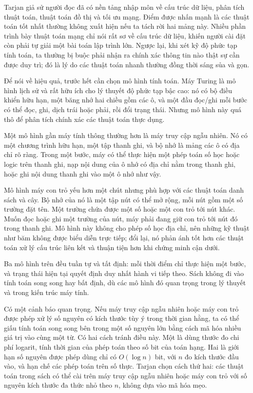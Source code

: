 \documentclass[11pt]{article}
\begin{document}
Tarjan giả sử người đọc đã có nền tảng nhập môn về cấu trúc dữ liệu, phân tích
thuật toán, thuật toán đồ thị và tối ưu mạng. Điểm được nhấn mạnh là các thuật
toán tốt nhất thường không xuất hiện nếu ta tách rời hai mảng này. Nhiều phần
trình bày thuật toán mạng chỉ nói rất sơ về cấu trúc dữ liệu, khiến người cài
đặt còn phải tự giải một bài toán lập trình lớn. Ngược lại, khi xét kỹ độ phức
tạp tính toán, ta thường bị buộc phải nhận ra chính xác thông tin nào thật sự
cần được duy trì; đó là lý do các thuật toán nhanh thường đồng thời sáng sủa
và gọn.

Để nói về hiệu quả, trước hết cần chọn mô hình tính toán. Máy Turing là mô
hình lịch sử và rất hữu ích cho lý thuyết độ phức tạp bậc cao: nó có bộ điều
khiển hữu hạn, một băng nhớ hai chiều gồm các ô, và một đầu đọc/ghi mỗi bước
có thể đọc, ghi, dịch trái hoặc phải, rồi đổi trạng thái. Nhưng mô hình này quá
thô để phân tích chính xác các thuật toán thực dụng.

Một mô hình gần máy tính thông thường hơn là máy truy cập ngẫu nhiên. Nó có
một chương trình hữu hạn, một tập thanh ghi, và bộ nhớ là mảng các ô có địa chỉ
rõ ràng. Trong một bước, máy có thể thực hiện một phép toán số học hoặc logic
trên thanh ghi, nạp nội dung của ô nhớ có địa chỉ nằm trong thanh ghi, hoặc ghi
nội dung thanh ghi vào một ô nhớ như vậy.

Mô hình máy con trỏ yếu hơn một chút nhưng phù hợp với các thuật toán danh
sách và cây. Bộ nhớ của nó là một tập nút có thể mở rộng, mỗi nút gồm một số
trường đặt tên. Một trường chứa được một số hoặc một con trỏ tới nút khác. Muốn
đọc hoặc ghi một trường của nút, máy phải đang giữ con trỏ tới nút đó trong
thanh ghi. Mô hình này không cho phép số học địa chỉ, nên những kỹ thuật như
băm không được biểu diễn trực tiếp; đổi lại, nó phản ánh tốt hơn các thuật toán
xử lý cấu trúc liên kết và thuận tiện hơn khi chứng minh cận dưới.

Ba mô hình trên đều tuần tự và tất định: mỗi thời điểm chỉ thực hiện một bước,
và trạng thái hiện tại quyết định duy nhất hành vi tiếp theo. Sách không đi vào
tính toán song song hay bất định, dù các mô hình đó quan trọng trong lý thuyết
và trong kiến trúc máy tính.

Có một cảnh báo quan trọng. Nếu máy truy cập ngẫu nhiên hoặc máy con trỏ được
phép xử lý số nguyên có kích thước tùy ý trong thời gian hằng, ta có thể giấu
tính toán song song bên trong một số nguyên lớn bằng cách mã hóa nhiều giá trị
vào cùng một từ. Có hai cách tránh điều này. Một là dùng thước đo chi phí
logarit, tính thời gian của phép toán theo số bit của toán hạng. Hai là giới
hạn số nguyên được phép dùng chỉ có \(O(\log n)\) bit, với \(n\) đo kích thước
đầu vào, và hạn chế các phép toán trên số thực. Tarjan chọn cách thứ hai: các
thuật toán trong sách có thể cài trên máy truy cập ngẫu nhiên hoặc máy con trỏ
với số nguyên kích thước đa thức nhỏ theo \(n\), không dựa vào mã hóa mẹo.
\end{document}
